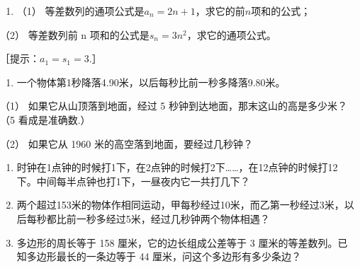 {\centering
\scriptsize\setlength{\tabcolsep}{2.2pt}%
\par
}

\begin{enumerate}[start=2]
\item
  （1）
  等差数列的通项公式是\(a_{n} = 2n + 1\)，求它的前\(n\)项和的公式；
\end{enumerate}

（2） 等差数列前 n 项和的公式是\(s_{n}=3n^{2}\)，求它的通项公式。

［提示：\(a_{1}=s_{1}=3\).］

\begin{enumerate}[start=3]
\item
  一个物体第1秒降落4.90米，以后每秒比前一秒多降落9.80米。
\end{enumerate}

（1） 如果它从山顶落到地面，经过 5
秒钟到达地面，那末这山的高是多少米？（5 看成是准确数.）

（2） 如果它从 1960 米的高空落到地面，要经过几秒钟？

\begin{enumerate}[start=4]
\item
  时钟在1点钟的时候打1下，在2点钟的时候打2下\ldots\ldots，在12点钟的时候打12下。中间每半点钟也打1下，一昼夜内它一共打几下？
\item
  两个超过153米的物体作相同运动，甲每秒经过10米，而乙第一秒经过3米，以后每秒都比前一秒多经过5米，经过几秒钟两个物体相遇？
\item
  多边形的周长等于 158 厘米，它的边长组成公差等于 3
  厘米的等差数列。已知多边形最长的一条边等于 44
  厘米，问这个多边形有多少条边？
\end{enumerate}

